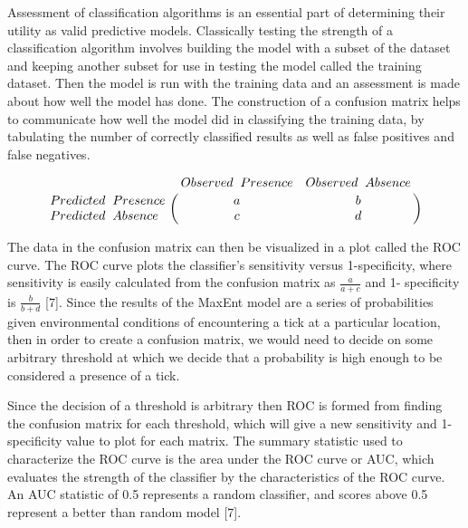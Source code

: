 Assessment of classification algorithms is an essential part of determining their utility as valid predictive models. Classically testing the strength of a classification algorithm involves building the model with a subset of the dataset and keeping another subset for use in testing the model called the training dataset. Then the model is run with the training data and an assessment is made about how well the model has done. The construction of a confusion matrix helps to communicate how well the model did in classifying the training data, by tabulating the number of correctly classified results as well as false positives and false negatives. 

\begin{equation} \bordermatrix{~ & Observed \hspace{0.2cm} Presence & Observed \hspace{0.2cm} Absence \cr
                  Predicted\hspace{0.2cm}  Presence & a & b \cr
                  Predicted \hspace{0.2cm} Absence & c & d \cr} \end{equation}
                  
\noindent The data in the confusion matrix can then be visualized in a plot called the ROC curve. The ROC curve plots the classifier's sensitivity versus 1-specificity, where sensitivity is easily calculated from the confusion matrix as  $\frac{a}{a+c}$ and 1- specificity is $\frac{b}{b+d}$ [7]. Since the results of the MaxEnt model are a series of probabilities given environmental conditions of encountering a tick at a particular location, then in order to create a confusion matrix, we would need to decide on some arbitrary threshold at which we decide that a probability is high enough to be considered a presence of a tick. \newline

\noindent Since the decision of a threshold is arbitrary then ROC is formed from finding the confusion matrix for each threshold, which will give a new sensitivity and 1-specificity value to plot for each matrix. The summary statistic used to characterize the ROC curve is the area under the ROC curve or AUC, which evaluates the strength of the classifier by the characteristics of the ROC curve. An AUC statistic of 0.5 represents a random classifier, and scores above 0.5 represent a better than random model [7].    \newline


